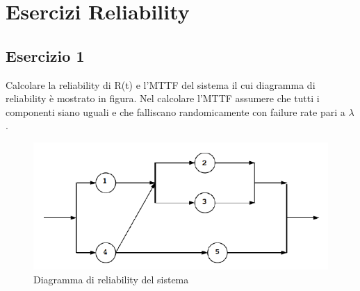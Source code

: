 \chapter{Esercizi Reliability}   

	\section{Esercizio 1}
	Calcolare la reliability di R(t) e l'MTTF del sistema il cui diagramma di reliability è mostrato in figura. Nel calcolare l'MTTF assumere che tutti i componenti siano uguali e che falliscano randomicamente con failure rate pari a $\lambda$.
	
	\begin{figure}[H]
		\centering
		\includegraphics[scale=0.8]{./immagine/reliability_es1.png}
		\caption{Diagramma di reliability del sistema}
		\label{fig:reliability_es1}
	\end{figure}
	
